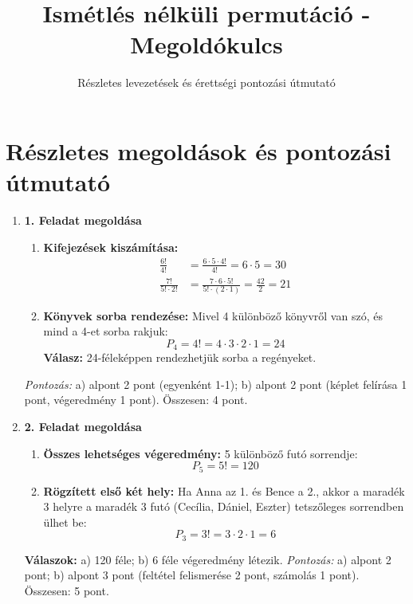 \documentclass[12pt,a4paper]{article}
\title{Ismétlés nélküli permutáció - Megoldókulcs}
\author{Részletes levezetések és érettségi pontozási útmutató}
\date{}
\begin{document}
\maketitle

\section*{Részletes megoldások és pontozási útmutató}

\begin{enumerate}[label=\arabic*., leftmargin=*]
    \item \textbf{1. Feladat megoldása}
    \begin{enumerate}[label=\alph*)]
        \item \textbf{Kifejezések kiszámítása:}
        \begin{align*}
            \frac{6!}{4!} &= \frac{6 \cdot 5 \cdot 4!}{4!} = 6 \cdot 5 = 30 \\
            \frac{7!}{5! \cdot 2!} &= \frac{7 \cdot 6 \cdot 5!}{5! \cdot (2 \cdot 1)} = \frac{42}{2} = 21
        \end{align*}
        \item \textbf{Könyvek sorba rendezése:}
        Mivel 4 különböző könyvről van szó, és mind a 4-et sorba rakjuk:
        \begin{equation*}
            P_4 = 4! = 4 \cdot 3 \cdot 2 \cdot 1 = 24
        \end{equation*}
        \textbf{Válasz:} 24-féleképpen rendezhetjük sorba a regényeket.
    \end{enumerate}
    \textit{Pontozás:} a) alpont 2 pont (egyenként 1-1); b) alpont 2 pont (képlet felírása 1 pont, végeredmény 1 pont). Összesen: 4 pont.

    \vspace{0.4cm}

    \item \textbf{2. Feladat megoldása}
    \begin{enumerate}[label=\alph*)]
        \item \textbf{Összes lehetséges végeredmény:} 
        5 különböző futó sorrendje:
        \begin{equation*}
            P_5 = 5! = 120
        \end{equation*}
        \item \textbf{Rögzített első két hely:}
        Ha Anna az 1. és Bence a 2., akkor a maradék 3 helyre a maradék 3 futó (Cecília, Dániel, Eszter) tetszőleges sorrendben ülhet be:
        \begin{equation*}
            P_3 = 3! = 3 \cdot 2 \cdot 1 = 6
        \end{equation*}
    \end{enumerate}
    \textbf{Válaszok:} a) 120 féle; b) 6 féle végeredmény létezik.
    \textit{Pontozás:} a) alpont 2 pont; b) alpont 3 pont (feltétel felismerése 2 pont, számolás 1 pont). Összesen: 5 pont.


\end{enumerate}
\end{document}
